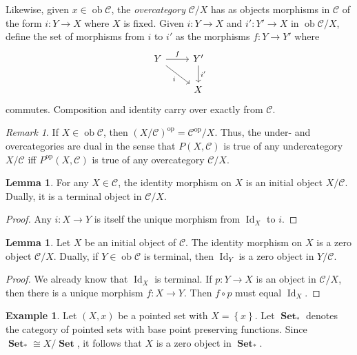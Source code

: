 \documentclass[10pt,letterpaper,cm]{nupset}
\theoremstyle{definition}
\newtheorem{exmp}[definition]{Example}
\theoremstyle{theorem}
\newtheorem{lemma}[definition]{Lemma}
\theoremstyle{remark}
\newtheorem{remark}[definition]{Remark}
\newcommand{\1}{\mathbf{1}}
\renewcommand{\c}{\mathscr{C}}
\newcommand{\0}{\vec 0}
\DeclareMathOperator{\id}{Id}
\DeclareMathOperator{\op}{op}
\DeclareMathOperator{\ob}{ob}
\DeclareMathOperator{\set}{\mathbf{Set}}
\begin{document}
\medskip

Likewise, given $x \in \ob \c$, the \textit{overcategory} ${\c}/{X}$ has as objects morphisms in $\c$ of the form $i : Y \to X$ where $X$ is fixed. Given $i:  Y \to X$ and  $i' : Y' \to X$ in $\ob {\c}/{X}$, define the set of morphisms from $i$ to $i'$ as the morphisms $f: Y \to Y'$ where
\[ \begin{tikzcd}
Y \arrow[r, "f"] \arrow[swap, dr,  " i "] & Y' \arrow[d, "i '"] \\%
 & X
\end{tikzcd}
\]
commutes.
 Composition and identity carry over exactly from $\c$.


\begin{remark}
If $X \in \ob \c$, then $\left({X}/{\c}\right)^{\op} = {\c^{\op}}/{X}$. Thus, the under- and overcategories are dual in the sense that $P(X, \c)$ is true of any undercategory ${X}/{\c}$ iff $P^{\op}(X, \c)$ is true of any overcategory ${\c}/{X}$. 
\end{remark}

\begin{lemma}
For any $X \in \c$, the identity morphism on $X$ is an initial object ${X}/{\c}$. Dually, it is a terminal object in ${\c}/{X}$.
\end{lemma}
\begin{proof}
Any $i: X \to Y$ is itself the unique morphism from $\id_X$ to $i$.
\end{proof}

\begin{lemma}
Let $X$ be an initial object of $\c$. The identity morphism on $X$ is a zero object ${\c}/{X}$. Dually, if $Y \in \ob \c$ is terminal, then $\id_Y$ is a zero object in ${Y}/{\c}$.
\end{lemma}
\begin{proof}
We already know that $\id_X$ is terminal. If $p: Y \to X$ is an object in ${\c}/{X}$, then there is a unique morphism $f: X \to Y$. Then $f\circ p$ must equal $\id_X$.
\end{proof}

\begin{exmp}
Let $\left(X, x\right)$ be a pointed set with $X= \left\{x\right\}$. Let $\set_{\ast}$ denotes the category of pointed sets with base point preserving functions. Since  $\set_{\ast} \cong {X}/{\set}$, it follows that $X$ is a zero object in $\set_{\ast}$.
\end{exmp}

\smallskip
\end{document}
